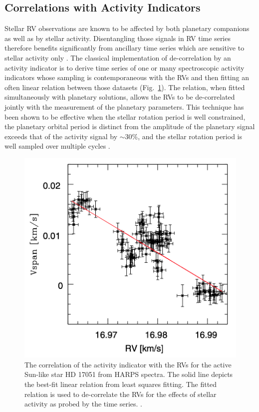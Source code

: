 \subsection{Correlations with Activity Indicators}
Stellar RV observations are known to be affected by both planetary companions as
well as by stellar activity. Disentangling those signals in RV time series
therefore benefits significantly from ancillary time series which are sensitive
to stellar activity only \citep{boisse09}.
The classical implementation of de-correlation by
an activity indicator is to derive time series of one or many spectroscopic
activity indicators whose sampling is contemporaneous with the RVs and then
fitting an often linear relation between those datasets (Fig.~\ref{fig:corr}).
The relation, when fitted simultaneously with planetary solutions, allows the RVs
to be de-correlated jointly with the measurement of the planetary parameters.
This technique has been shown to be effective when the stellar rotation period
\prot{} is well constrained, the planetary orbital period is distinct from
\prot{,} the amplitude of the planetary signal exceeds that of the activity signal
by $\sim 30$\%, and the stellar rotation period is well sampled over multiple
cycles \citep{boisse11}. \\

\begin{figure}
  \centering
  \includegraphics[width=.6\textwidth]{figures/vspan_rv.png}
  \caption{The correlation of the \vspan{} activity indicator with the RVs for the
    active Sun-like star HD 17051 from HARPS spectra. The solid line depicts the
    best-fit linear relation from least squares fitting. The fitted relation is
    used to de-correlate the RVs for the effects of stellar activity as probed by
    the \vspan{} time series. \citep[Image credit:][]{boisse11}.}
  \label{fig:corr}
\end{figure}

